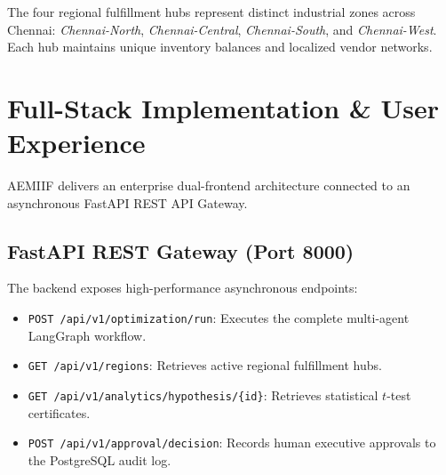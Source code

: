\documentclass[conference]{IEEEtran}
\begin{document}
\begin{table}[htbp]
\centering
\caption{Dataset Evolution: Preliminary Prototype vs. Latest Enterprise Release}
\label{tab:dataset_evolution}
\end{table}

The four regional fulfillment hubs represent distinct industrial zones across Chennai: \textit{Chennai-North}, \textit{Chennai-Central}, \textit{Chennai-South}, and \textit{Chennai-West}. Each hub maintains unique inventory balances and localized vendor networks.

\section{Full-Stack Implementation \& User Experience}
AEMIIF delivers an enterprise dual-frontend architecture connected to an asynchronous FastAPI REST API Gateway.

\subsection{FastAPI REST Gateway (Port 8000)}
The backend exposes high-performance asynchronous endpoints:
\begin{itemize}
    \item \texttt{POST /api/v1/optimization/run}: Executes the complete multi-agent LangGraph workflow.
    \item \texttt{GET /api/v1/regions}: Retrieves active regional fulfillment hubs.
    \item \texttt{GET /api/v1/analytics/hypothesis/\{id\}}: Retrieves statistical $t$-test certificates.
    \item \texttt{POST /api/v1/approval/decision}: Records human executive approvals to the PostgreSQL audit log.
\end{itemize}
\end{document}
